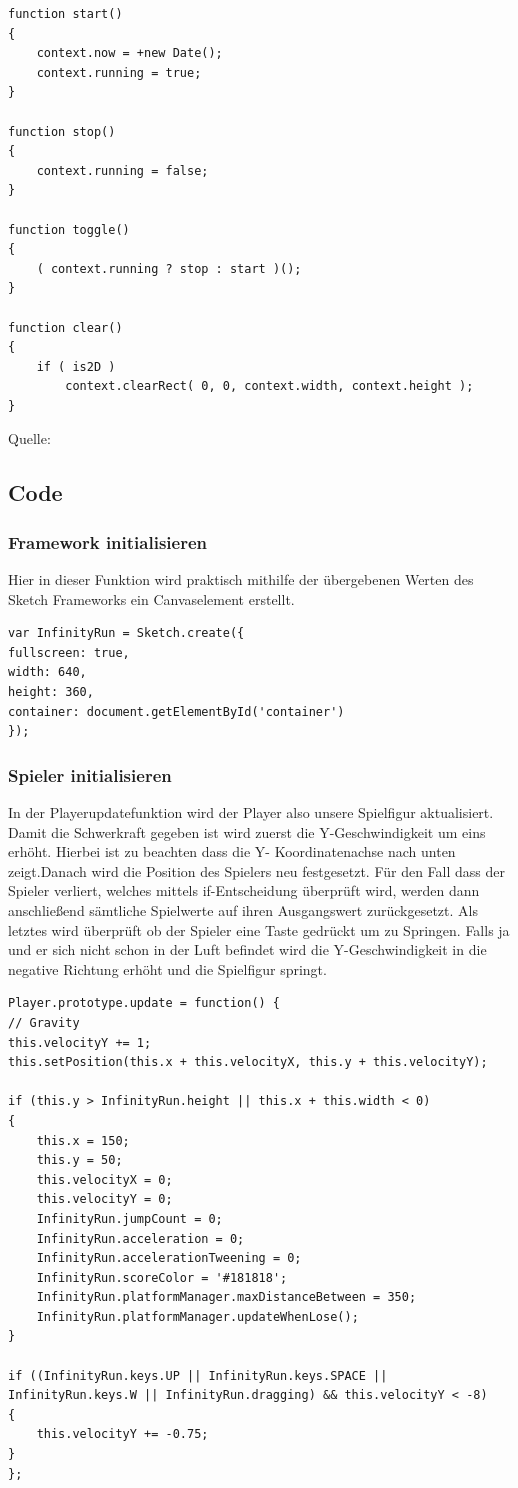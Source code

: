 \lstset{language=java}
\begin{lstlisting}[frame=single]
function start() 
{
	context.now = +new Date();
    context.running = true;
}
        
function stop() 
{
	context.running = false;
}
        
function toggle() 
{       
	( context.running ? stop : start )();
}
        
function clear() 
{        
	if ( is2D )
        context.clearRect( 0, 0, context.width, context.height );
}
\end{lstlisting}
Quelle: \cite{sketch}
\subsection{Code}
\subsubsection{Framework initialisieren}
Hier in dieser Funktion wird praktisch mithilfe der \"ubergebenen Werten des Sketch Frameworks ein Canvaselement erstellt.
\lstset{language=java}
\begin{lstlisting}[frame=single]
var InfinityRun = Sketch.create({
fullscreen: true,
width: 640,
height: 360,
container: document.getElementById('container')
});
\end{lstlisting}
\subsubsection{Spieler initialisieren}
In der Playerupdatefunktion wird der Player also unsere Spielfigur aktualisiert. Damit die Schwerkraft gegeben ist wird zuerst die Y-Geschwindigkeit um eins erhöht. Hierbei ist zu beachten dass die Y- Koordinatenachse nach unten zeigt.Danach wird die Position des Spielers neu festgesetzt. Für den Fall dass der Spieler verliert, welches mittels if-Entscheidung überprüft wird, werden dann anschließend sämtliche Spielwerte auf ihren Ausgangswert zurückgesetzt. Als letztes wird überprüft ob der Spieler eine Taste gedrückt um zu Springen. Falls ja und er sich nicht schon in der Luft befindet wird die Y-Geschwindigkeit in die negative Richtung erhöht und die Spielfigur springt.
\lstset{language=java}
\begin{lstlisting}[frame=single]
Player.prototype.update = function() {
// Gravity 
this.velocityY += 1;
this.setPosition(this.x + this.velocityX, this.y + this.velocityY);

if (this.y > InfinityRun.height || this.x + this.width < 0) 
{
	this.x = 150;
	this.y = 50;
	this.velocityX = 0;
	this.velocityY = 0;
	InfinityRun.jumpCount = 0;
	InfinityRun.acceleration = 0;
	InfinityRun.accelerationTweening = 0;
	InfinityRun.scoreColor = '#181818';
	InfinityRun.platformManager.maxDistanceBetween = 350;
	InfinityRun.platformManager.updateWhenLose();
}

if ((InfinityRun.keys.UP || InfinityRun.keys.SPACE || InfinityRun.keys.W || InfinityRun.dragging) && this.velocityY < -8) 
{
	this.velocityY += -0.75;
}
};
\end{lstlisting}

